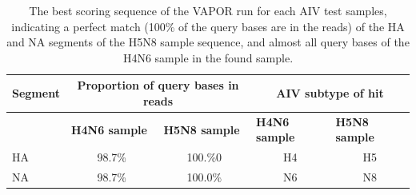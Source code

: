 \setlength{\tabcolsep}{8pt}
\renewcommand{\arraystretch}{1.3}
\begin{table}[ht!]
    \centering
    \hspace*{-16pt}
    \begin{tabular}{@{}lcccc@{}}
    \toprule
    \multicolumn{1}{l}{\textbf{Segment}} & \multicolumn{2}{c}{\textbf{Proportion of query bases in reads}}                             & \multicolumn{2}{c}{\textbf{AIV subtype of hit}}                                         \\ \midrule
                                         & \multicolumn{1}{l}{\textbf{H4N6 sample}} & \multicolumn{1}{l}{\textbf{H5N8 sample}} & \multicolumn{1}{l}{\textbf{H4N6 sample}} & \multicolumn{1}{l}{\textbf{H5N8 sample}} \\ \cmidrule(l){2-5} 
    HA                                   & 98.7\%                                    & 100.\%0                                      & H4                                       & H5                                       \\
    NA                                   & 98.7\%                                    & 100.0\%                                      & N6                                       & N8                                       \\ \bottomrule
    \end{tabular}
    \caption[Results of VAPOR run with AIV test samples.]{The best scoring sequence of the VAPOR run for each AIV test samples, indicating a perfect match (100\% of the query bases are in the reads) of the HA and NA segments of the H5N8 sample sequence, and almost all query bases of the H4N6 sample in the found sample.}    
\label{tab:4-aiv-vapor}
\end{table}

